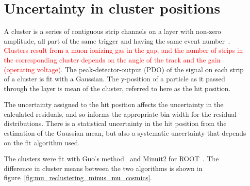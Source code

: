 

\chapter[Cluster position uncertainty]{Uncertainty in cluster positions}
\label{appendix:clustering}


A cluster is a series of contiguous strip channels on a layer with non-zero amplitude, all part of the same trigger and having the same event number~\cite{lefebvre_thesis}. \textcolor{red}{Clusters result from a muon ionizing gas in the gap, and the number of strips in the corresponding cluster depends on the angle of the track and the gain (operating voltage)}. The peak-detector-output (PDO) of the signal on each strip of a cluster is fit with a Gaussian. The y-position of a particle as it passed through the layer is mean of the cluster, referred to here as the hit position.

The uncertainty assigned to the hit position affects the uncertainty in the calculated residuals, and so informs the appropriate bin width for the residual distributions. There is a statistical uncertainty in the hit position from the estimation of the Gaussian mean, but also a systematic uncertainty that depends on the fit algorithm used. 

The clusters were fit with Guo's method~\cite{guo_simple_2011} and Minuit2 for ROOT~\cite{hatlo_developments_2005}. The difference in cluster means between the two algorithms is shown in figure~\ref{fig:mu_reclustering_minus_mu_cosmics}.

